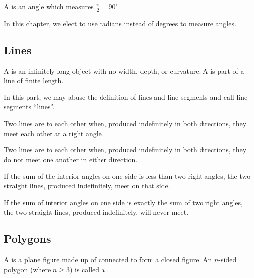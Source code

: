 \begin{definition}
    A  is an angle which measures $\frac\pi2 = 90^\circ$.
\end{definition}

In this chapter, we elect to use radians instead of degrees to measure angles.

\subsection{Lines}
\begin{definition}
    A  is an infinitely long object with no width, depth, or curvature. A  is part of a line of finite length.
\end{definition}

\begin{remark}
    In this part, we may abuse the definition of lines and line segments and call line segments ``lines''.
\end{remark}

\begin{definition}
    Two lines are  to each other when, produced indefinitely in both directions, they meet each other at a right angle.
\end{definition}

\begin{definition}
    Two lines are  to each other when, produced indefinitely in both directions, they do not meet one another in either direction.
\end{definition}

\begin{axiom}
    If the sum of the interior angles on one side is less than two right angles, the two straight lines, produced indefinitely, meet on that side.
\end{axiom}

\begin{proposition}
    If the sum of interior angles on one side is exactly the sum of two right angles, the two straight lines, produced indefinitely, will never meet.
\end{proposition}

\subsection{Polygons}
\begin{definition}
    A  is a plane figure made up of  connected to form a closed figure. An $n$-sided polygon (where $n \geq 3$) is called a .
\end{definition}

